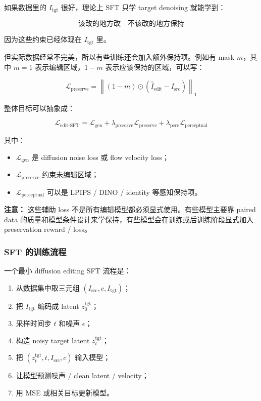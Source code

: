 如果数据里的 $I_\text{tgt}$ 很好，理论上 SFT 只学 target denoising 就能学到：

\[
\text{该改的地方改}
\quad
\text{不该改的地方保持}
\]

因为这些约束已经体现在 $I_\text{tgt}$ 里。

但实际数据经常不完美，所以有些训练还会加入额外保持项。例如有 mask $m$，其中 $m=1$ 表示编辑区域，$1-m$ 表示应该保持的区域，可以写：

\[
\mathcal{L}_\text{preserve}
=
\left\|
(1-m)\odot
\left(
\hat{I}_\text{edit}
-
I_\text{src}
\right)
\right\|_1
\]

整体目标可以抽象成：

\[
\mathcal{L}_\text{edit-SFT}
=
\mathcal{L}_\text{gen}
+
\lambda_\text{preserve}\mathcal{L}_\text{preserve}
+
\lambda_\text{perc}\mathcal{L}_\text{perceptual}
\]

其中：

\begin{itemize}[leftmargin=1.5em]
  \item $\mathcal{L}_\text{gen}$ 是 diffusion noise loss 或 flow velocity loss；
  \item $\mathcal{L}_\text{preserve}$ 约束未编辑区域；
  \item $\mathcal{L}_\text{perceptual}$ 可以是 LPIPS / DINO / identity 等感知保持项。
\end{itemize}

\begin{warnbox}
\textbf{注意：} 这些辅助 loss 不是所有编辑模型都必须显式使用。有些模型主要靠 paired data 的质量和模型条件设计来学保持，有些模型会在训练或后训练阶段显式加入 preservation reward / loss。
\end{warnbox}

\subsubsection{SFT 的训练流程}

一个最小 diffusion editing SFT 流程是：

\begin{enumerate}[leftmargin=1.5em]
  \item 从数据集中取三元组 $(I_\text{src},c,I_\text{tgt})$；
  \item 把 $I_\text{tgt}$ 编码成 latent $z_0^\text{tgt}$；
  \item 采样时间步 $t$ 和噪声 $\epsilon$；
  \item 构造 noisy target latent $z_t^\text{tgt}$；
  \item 把 $(z_t^\text{tgt},t,I_\text{src},c)$ 输入模型；
  \item 让模型预测噪声 / clean latent / velocity；
  \item 用 MSE 或相关目标更新模型。
\end{enumerate}

